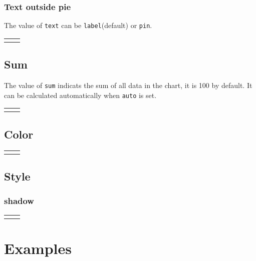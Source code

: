 \documentclass{article}
\newcommand{\demo}[2][1]{
  \begin{center}
  \begin{tabular}{cc}
    \begin{minipage}{.49\linewidth}
      \centering
      \resizebox{#1\linewidth}{!}{
        
      }
    \end{minipage}
    &
    \begin{minipage}{.45\linewidth}
      
    \end{minipage}
  \end{tabular}
  \end{center}
}
\newcommand{\example}[2][1]{
  \begin{center}  
    \resizebox{#1\linewidth}{!}{
      
    }
  \end{center}
  
}
\begin{document}
\subsubsection{Text outside pie}
The value of \texttt{text} can be \texttt{label}(default) or
\texttt{pin}.

\demo[0.6]{text}

\subsection{Sum}
The value of \texttt{sum} indicats the sum of all data in the chart,
it is 100 by default. It can be calculated automatically when
\texttt{auto} is set.

\demo{sum}

\subsection{Color}
\demo{color}

\subsection{Style}
\subsubsection{shadow}
\demo[0.6]{shadow}

\section{Examples}


\end{document}
